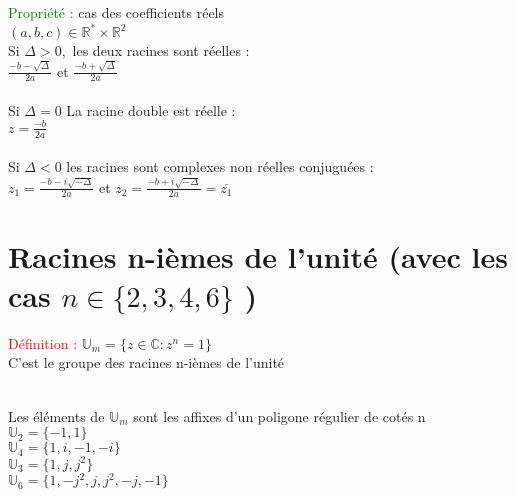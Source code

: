 \documentclass{article}
\begin{document}
\textcolor{green}{Propriété :} cas des coefficients réels \\
$(a,b,c) \in \mathbb{R}^* \times \mathbb{R}^2$ \\
Si $\Delta > 0,$ les deux racines sont réelles : \\
\indent $\frac{-b-\sqrt{\Delta}}{2a}$ et $\frac{-b+\sqrt{\Delta}}{2a}$ \\ \\
Si $\Delta =0$ La racine double est réelle : \\
\indent $z=\frac{-b}{2a}$ \\ \\
Si $\Delta<0$ les racines sont complexes non réelles conjuguées : \\
\indent $z_1=\frac{-b-i\sqrt{-\Delta}}{2a}$ et $z_2=\frac{-b+i\sqrt{-\Delta}}{2a}=\overline{z_1}$
\section{Racines n-ièmes de l'unité (avec les cas $n \in \lbrace 2,3,4,6 \rbrace$ )}
\textcolor{red}{Définition :} $\mathbb{U}_m=\lbrace z \in \mathbb{C}: z^n=1 \rbrace$ \\
C'est le groupe des racines n-ièmes de l'unité \\
  \\Les éléments de $\mathbb{U}_m$ sont les affixes d'un poligone régulier de cotés n \\
\indent  $\mathbb{U}_2=\lbrace -1,1 \rbrace$ \\
\indent  $\mathbb{U}_4=\lbrace 1,i,-1,-i \rbrace$ \\
\indent  $\mathbb{U}_3=\lbrace 1,j,j^2 \rbrace$ \\
\indent   $\mathbb{U}_6=\lbrace 1,-j^2,j,j^2,-j,-1 \rbrace$ \\
\end{document}
